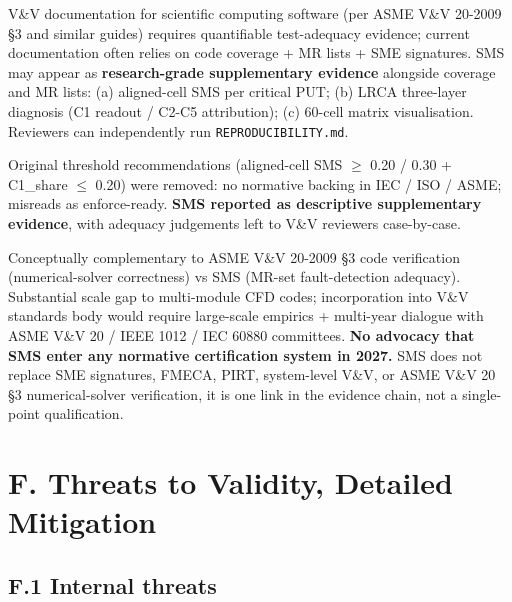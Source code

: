 \documentclass[acmsmall,screen,review]{acmart}
\begin{document}
V\&V documentation for scientific computing software (per ASME V\&V
20-2009 §3 and similar guides) requires quantifiable test-adequacy
evidence; current documentation often relies on code coverage + MR lists
+ SME signatures. SMS may appear as \textbf{research-grade supplementary
evidence} alongside coverage and MR lists: (a) aligned-cell SMS per
critical PUT; (b) LRCA three-layer diagnosis (C1 readout / C2-C5
attribution); (c) 60-cell matrix visualisation. Reviewers can
independently run \texttt{REPRODUCIBILITY.md}.

Original threshold recommendations (aligned-cell SMS $\geq$ 0.20 / 0.30 +
C1\_share $\leq$ 0.20) were removed: no normative backing in IEC / ISO /
ASME; misreads as enforce-ready. \textbf{SMS reported as descriptive
supplementary evidence}, with adequacy judgements left to V\&V reviewers
case-by-case.

Conceptually complementary to ASME V\&V 20-2009 §3 code verification
(numerical-solver correctness) vs SMS (MR-set fault-detection adequacy).
Substantial scale gap to multi-module CFD codes; incorporation into V\&V
standards body would require large-scale empirics + multi-year
dialogue with ASME V\&V 20 / IEEE 1012 / IEC 60880 committees.
\textbf{No advocacy that SMS enter any normative certification system in
2027.} SMS does not replace SME signatures, FMECA, PIRT, system-level
V\&V, or ASME V\&V 20 §3 numerical-solver verification, it is one
link in the evidence chain, not a single-point qualification.


\section{F. Threats to Validity, Detailed Mitigation}\label{f.-threats-to-validity-detailed-mitigation}

\subsection{F.1 Internal threats}\label{f.1-internal-threats}
\end{document}
